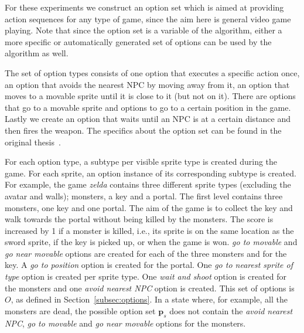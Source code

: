 For these experiments we construct an option set which is aimed at providing
action sequences for any type of game, since the aim here is general video game
playing.  Note that since the option set is a variable of the algorithm, either
a more specific or automatically generated set of options can be used by the
algorithm as well.

The set of option types consists of one option that executes a specific action
once, an option that avoids the nearest NPC by moving away from it, an option
that moves to a movable sprite until it is close to it (but not on it). There
are options that go to a movable sprite and options to go to a certain position
in the game.  Lastly we create an option that waits until an NPC is at a certain
distance and then fires the weapon. The specifics about the option set can be
found in the original thesis~\cite{de2016monte}.

For each option type, a subtype per visible sprite type is created during the
game. For each sprite, an option instance of its corresponding subtype is
created. For example, the game \textit{zelda} contains three different sprite
types (excluding the avatar and walls); monsters, a key and a portal. The first
level contains three monsters, one key and one portal. The aim of the game is to
collect the key and walk towards the portal without being killed by the
monsters. The score is increased by 1 if a monster is killed, i.e., its sprite
is on the same location as the sword sprite, if the key is picked up, or when
the game is won.  \emph{go to movable} and \emph{go near movable} options are
created for each of the three monsters and for the key. A \emph{go to position}
option is created for the portal.  One \emph{go to nearest sprite of type}
option is created per sprite type. One \emph{wait and shoot} option is created
for the monsters and one \emph{avoid nearest NPC} option is created. This set of
options is $O$, as defined in Section~\ref{subsec:options}. In a state where,
for example, all the monsters are dead, the possible option set $\mathbf{p}_s$
does not contain the \emph{avoid nearest NPC}, \emph{go to movable} and \emph{go
near movable} options for the monsters.

